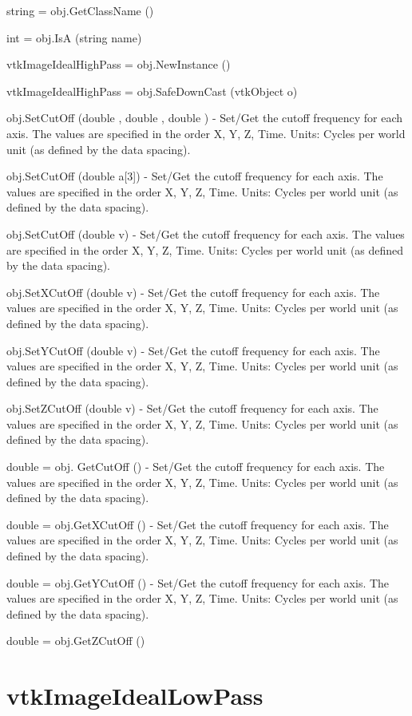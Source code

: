 \begin{DoxyItemize}
\item {\ttfamily string = obj.\-Get\-Class\-Name ()}  
\item {\ttfamily int = obj.\-Is\-A (string name)}  
\item {\ttfamily vtk\-Image\-Ideal\-High\-Pass = obj.\-New\-Instance ()}  
\item {\ttfamily vtk\-Image\-Ideal\-High\-Pass = obj.\-Safe\-Down\-Cast (vtk\-Object o)}  
\item {\ttfamily obj.\-Set\-Cut\-Off (double , double , double )} -\/ Set/\-Get the cutoff frequency for each axis. The values are specified in the order X, Y, Z, Time. Units\-: Cycles per world unit (as defined by the data spacing).  
\item {\ttfamily obj.\-Set\-Cut\-Off (double a\mbox{[}3\mbox{]})} -\/ Set/\-Get the cutoff frequency for each axis. The values are specified in the order X, Y, Z, Time. Units\-: Cycles per world unit (as defined by the data spacing).  
\item {\ttfamily obj.\-Set\-Cut\-Off (double v)} -\/ Set/\-Get the cutoff frequency for each axis. The values are specified in the order X, Y, Z, Time. Units\-: Cycles per world unit (as defined by the data spacing).  
\item {\ttfamily obj.\-Set\-X\-Cut\-Off (double v)} -\/ Set/\-Get the cutoff frequency for each axis. The values are specified in the order X, Y, Z, Time. Units\-: Cycles per world unit (as defined by the data spacing).  
\item {\ttfamily obj.\-Set\-Y\-Cut\-Off (double v)} -\/ Set/\-Get the cutoff frequency for each axis. The values are specified in the order X, Y, Z, Time. Units\-: Cycles per world unit (as defined by the data spacing).  
\item {\ttfamily obj.\-Set\-Z\-Cut\-Off (double v)} -\/ Set/\-Get the cutoff frequency for each axis. The values are specified in the order X, Y, Z, Time. Units\-: Cycles per world unit (as defined by the data spacing).  
\item {\ttfamily double = obj. Get\-Cut\-Off ()} -\/ Set/\-Get the cutoff frequency for each axis. The values are specified in the order X, Y, Z, Time. Units\-: Cycles per world unit (as defined by the data spacing).  
\item {\ttfamily double = obj.\-Get\-X\-Cut\-Off ()} -\/ Set/\-Get the cutoff frequency for each axis. The values are specified in the order X, Y, Z, Time. Units\-: Cycles per world unit (as defined by the data spacing).  
\item {\ttfamily double = obj.\-Get\-Y\-Cut\-Off ()} -\/ Set/\-Get the cutoff frequency for each axis. The values are specified in the order X, Y, Z, Time. Units\-: Cycles per world unit (as defined by the data spacing).  
\item {\ttfamily double = obj.\-Get\-Z\-Cut\-Off ()}  
\end{DoxyItemize}\hypertarget{vtkimaging_vtkimageideallowpass}{}\section{vtk\-Image\-Ideal\-Low\-Pass}\label{vtkimaging_vtkimageideallowpass}
